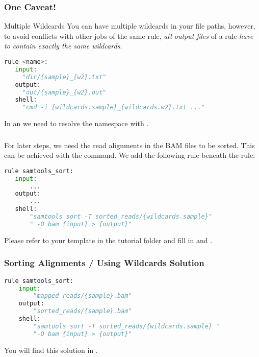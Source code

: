 \begin{frame}[fragile]
	\frametitle{One Caveat!}
	\begin{alertblock}{Multiple Wildcards}
		You can have multiple wildcards in your file paths, however, to avoid conflicts with other jobs of the same rule, \emph{all output files} of a rule \emph{have to contain exactly the same wildcards}.
	\end{alertblock}
    \pause
    \begin{lstlisting}[language=Python,style=Python]
rule <name>:
   input:
     "dir/{sample}_{w2}.txt"
   output:
     "out/{sample}_{w2}.out"
   shell:
     "cmd -i {wildcards.sample}_{wildcards.w2}.txt ..."
    \end{lstlisting}
    \begin{docs}
    	In an  we need to resolve the namespace with .
    \end{docs}
\end{frame}

\begin{frame}[fragile]
  \frametitle{}
  For later steps, we need the read alignments in the BAM files to be sorted. This can be achieved with the   command. We add the following rule beneath the  rule:
  \begin{lstlisting}[language=Python,style=Python]
rule samtools_sort:
   input:
       ...
   output:
       ...
   shell:
       "samtools sort -T sorted_reads/{wildcards.sample}"
       " -O bam {input} > {output}"
  \end{lstlisting}
  \begin{task}
  	Please refer to your template \newline {} in the tutorial folder and fill in  and .
  \end{task}
\end{frame}

\begin{frame}[fragile]
  \frametitle{Sorting Alignments / Using Wildcards Solution}
  \begin{lstlisting}[language=Python,style=Python]
rule samtools_sort:
    input:
        "mapped_reads/{sample}.bam"
    output:
        "sorted_reads/{sample}.bam"
    shell:
        "samtools sort -T sorted_reads/{wildcards.sample} "
        "-O bam {input} > {output}"
  \end{lstlisting}
  You will find this solution in .
\end{frame}

